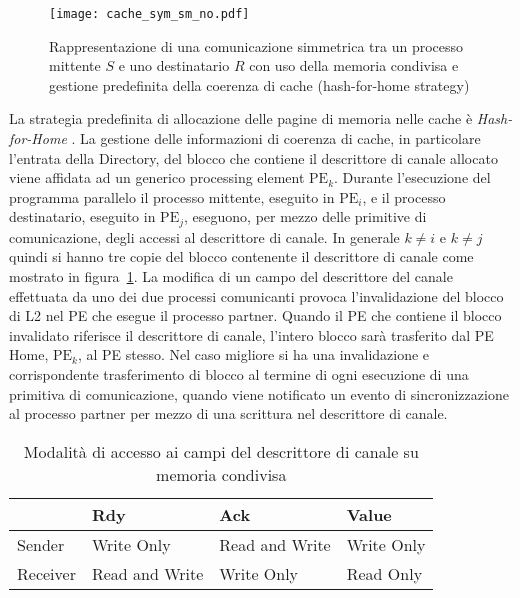 \begin{figure}[!t]
  \centering
  \texttt{[image: cache\_sym\_sm\_no.pdf]}
  \caption[Comunicazione simmetrica su memoria condivisa, non ottimizzata]{Rappresentazione di una comunicazione simmetrica tra un processo mittente $S$ e uno destinatario $R$ con uso della memoria condivisa e gestione predefinita della coerenza di cache (hash-for-home strategy)} 
  \label{fig:cache_sym_sm_no}
\end{figure}
La strategia predefinita di allocazione delle pagine di memoria nelle cache \`e \emph{Hash-for-Home} \cite{ug205}. La gestione delle informazioni di coerenza di cache, in particolare l'entrata della Directory, del blocco che contiene il descrittore di canale allocato viene affidata ad un generico processing element $\mathrm{PE}_k$. Durante l'esecuzione del programma parallelo il processo mittente, eseguito in $\mathrm{PE}_i$, e il processo destinatario, eseguito in $\mathrm{PE}_j$, eseguono, per mezzo delle primitive di comunicazione, degli accessi al descrittore di canale. In generale $k \neq i$ e $k \neq j$ quindi si hanno tre copie del blocco contenente il descrittore di canale come mostrato in figura~\ref{fig:cache_sym_sm_no}. La modifica di un campo del descrittore del canale effettuata da uno dei due processi comunicanti provoca l'invalidazione del blocco di L2 nel PE che esegue il processo partner. Quando il PE che contiene il blocco invalidato riferisce il descrittore di canale, l'intero blocco sar\`a trasferito dal PE Home, $\mathrm{PE}_k$, al PE stesso. Nel caso migliore si ha una invalidazione e corrispondente trasferimento di blocco al termine di ogni esecuzione di una primitiva di comunicazione, quando viene notificato un evento di sincronizzazione al processo partner per mezzo di una scrittura nel descrittore di canale.
\begin{table}[!b]
  \begin{center}
    \begin{tabular}{ | l | l | l | l |}
      \hline
      & Rdy & Ack & Value \\ \hline
      Sender & Write Only & Read and Write & Write Only \\
      Receiver & Read and Write & Write Only & Read Only \\
      \hline
    \end{tabular}
  \end{center}
  \caption[Modalit\`a di accesso ad un canale su memoria condivisa]{Modalit\`a di accesso ai campi del descrittore di canale su memoria condivisa}
  \label{tab:accessi_descr_ch}
\end{table}

